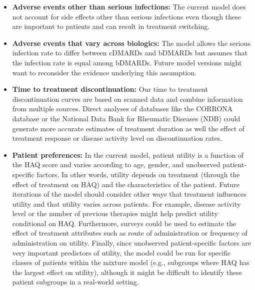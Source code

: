 \documentclass[11pt,final,fleqn]{article}\usepackage[]{graphicx}\usepackage[]{color}
\theoremstyle{plain}
\begin{document}
\begin{itemize}
\item \textbf{Adverse events other than serious infections:} The current model does not account for side effects other than serious infections even though these are important to patients and can result in treatment switching. 
\item \textbf{Adverse events that vary across biologics:} The model allows the serious infection rate to differ between cDMARDs and bDMARDs but assumes that the infection rate is equal among bDMARDs. Future model versions might want to reconsider the evidence underlying this assumption.
\item \textbf{Time to treatment discontinuation:} Our time to treatment discontinuation curves are based on scanned data and combine information from multiple sources. Direct analyses of databases like the CORRONA database or the National Data Bank for Rheumatic Diseases (NDB) could generate more accurate estimates of treatment duration as well the effect of treatment response or disease activity level on discontinuation rates.  
\item \textbf{Patient preferences:} In the current model, patient utility is a function of the HAQ score and varies according to age, gender, and unobserved patient-specific factors. In other words, utility depends on treatment (through the effect of treatment on HAQ) and the characteristics of the patient. Future iterations of the model should consider other ways that treatment influences utility and that utility varies across patients. For example, disease activity level or the number of previous therapies might help predict utility conditional on HAQ. Furthermore, surveys could be used to estimate the effect of treatment attributes such as route of administration or frequency of administration on utility. Finally, since unobserved patient-specific factors are very important predictors of utility, the model could be run for specific classes of patients within the mixture model (e.g., subgroups where HAQ has the largest effect on utility), although it might be difficult to identify these patient subgroups in a real-world setting. 


\end{itemize}
\end{document}
